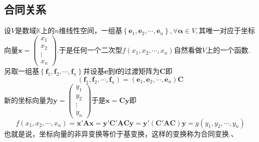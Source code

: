 \subsection{合同关系}
设$V$是数域$\mathbb{K}$上的$n$维线性空间，一组基$\left\{
    \bm{e}_1,\bm{e}_2,\cdots,\bm{e}_n
    \right\},\forall\bm{\alpha}\in V,$其唯一对应于坐标向量$\bm{x}=\begin{pmatrix}
        x_1 \\x_2\\\vdots\\x_n
    \end{pmatrix}$.于是任何一个二次型$
    f\left(
    x_1,x_2,\cdots,x_n
    \right)
$自然看做$V$上的一个函数.另取一组基$\left\{
    \bm{f}_1,\bm{f}_2,\cdots,\bm{f}_n
    \right\}$并设基$\bm{e}$到$\bm{f}$的过渡矩阵为$\bm{C}$即\[
    \left(
    \bm{f}_1,\bm{f}_2,\cdots,\bm{f}_n
    \right)=\left(
    \bm{e}_1,\bm{e}_2,\cdots,\bm{e}_n
    \right)\bm{C}
\]新的坐标向量为$\bm{y}=\begin{pmatrix}
        y_1 \\y_2\\\vdots\\y_n
    \end{pmatrix}$于是$\bm{x}=\bm{Cy}$即\[
    f\left(
    x_1,x_2,\cdots,x_n
    \right)=\bm{x}'\bm{Ax}=\bm{y}'\bm{C}'\bm{ACy}=\bm{y}'\left(
    \bm{C}'\bm{AC}
    \right)\bm{y}=g\left(
    y_1,y_2,\cdots,y_n
    \right)
\]也就是说，坐标向量的非异变换等价于基变换，这样的变换称为合同变换.、
